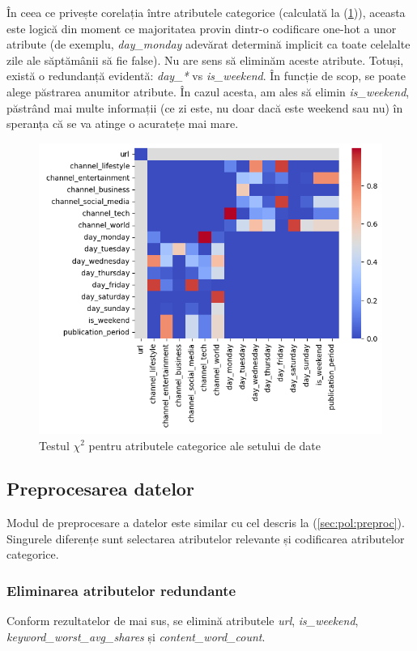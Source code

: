 \documentclass{article}
\begin{document}
În ceea ce privește corelația între atributele categorice (calculată la 
(\ref{fig:news:chi2})), aceasta este logică din moment ce majoritatea provin
dintr-o codificare one-hot a unor atribute (de exemplu, \textit{day\_monday} 
adevărat determină implicit ca toate celelalte zile ale săptămânii să fie false). 
Nu are sens să eliminăm aceste atribute. Totuși, există o redundanță evidentă:
\textit{day\_*} vs \textit{is\_weekend}. În funcție de scop, se poate alege 
păstrarea anumitor atribute. În cazul acesta, am ales să elimin 
\textit{is\_weekend}, păstrând mai multe informații (ce zi este, nu doar dacă
este weekend sau nu) în speranța că se va atinge o acuratețe mai mare.

\begin{figure}[htb]
    \centering
    \includegraphics[scale=0.7]{news_popularity/analysis/correlation/chi2.png}
    \caption{Testul $\chi^2$ pentru atributele categorice ale setului de date}
    \label{fig:news:chi2}
\end{figure}

\subsection{Preprocesarea datelor}
Modul de preprocesare a datelor este similar cu cel descris la 
(\ref{sec:pol:preproc}). Singurele diferențe sunt selectarea atributelor 
relevante și codificarea atributelor categorice.

\subsubsection{Eliminarea atributelor redundante}
Conform rezultatelor de mai sus, se elimină atributele \textit{url}, 
\textit{is\_weekend}, \textit{keyword\_worst\_avg\_shares} și 
\textit{content\_word\_count}.
\end{document}
